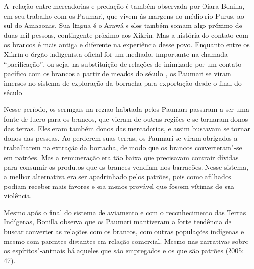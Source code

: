 A~relação entre mercadorias e predação é também observada por Oiara
Bonilla, em seu trabalho com os Paumari, que vivem às margens do médio
rio Purus, ao sul do Amazonas. Sua língua é o Arawá e eles também somam
algo próximo de duas mil pessoas, contingente próximo aos Xikrin. Mas a
história do contato com os brancos é mais antiga e diferente na
experiência desse povo. Enquanto entre os Xikrin o órgão indigenista
oficial foi um mediador importante na chamada ``pacificação'', ou seja,
na substituição de relações de inimizade por um contato pacífico com os
brancos a partir de meados do século , os Paumari se viram imersos no
sistema de exploração da borracha para exportação desde o final do
século .

Nesse período, os seringais na região habitada pelos Paumari passaram a
ser uma fonte de lucro para os brancos, que vieram de outras regiões e
se tornaram donos das terras. Eles eram também donos das mercadorias, e
assim buscavam se tornar donos das pessoas. Ao perderem suas terras, os
Paumari se viram obrigados a trabalharem na extração da borracha, de
modo que os brancos converteram"-se em patrões. Mas a remuneração era
tão baixa que precisavam contrair dívidas para consumir os produtos que
os brancos vendiam nos barracões. Nesse sistema, a melhor alternativa
era ser apadrinhado pelos patrões, pois como afilhados podiam receber
mais favores e era menos provável que fossem vítimas de sua violência.

Mesmo após o final do sistema de aviamento e com o reconhecimento das
Terras Indígenas, Bonilla observa que os Paumari mantiveram a forte
tendência de buscar converter as relações com os brancos, com outras
populações indígenas e mesmo com parentes distantes em relação
comercial. Mesmo nas narrativas sobre os espíritos"-animais há aqueles
que são empregados e os que são patrões (2005: 47).


